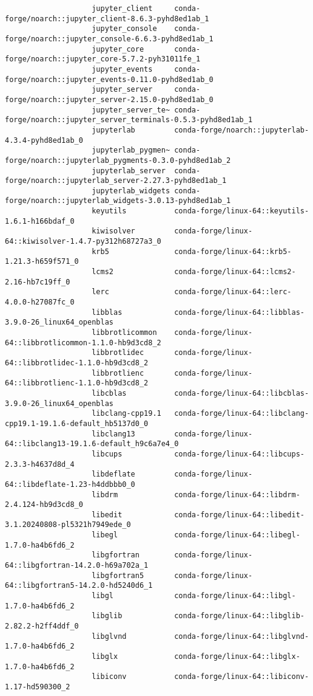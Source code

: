 \documentclass{article}
\begin{document}
\begin{enumerate}
\begin{itemize}
\begin{itemize}
\begin{itemize}
\begin{verbatim}
					jupyter_client     conda-forge/noarch::jupyter_client-8.6.3-pyhd8ed1ab_1 
					jupyter_console    conda-forge/noarch::jupyter_console-6.6.3-pyhd8ed1ab_1 
					jupyter_core       conda-forge/noarch::jupyter_core-5.7.2-pyh31011fe_1 
					jupyter_events     conda-forge/noarch::jupyter_events-0.11.0-pyhd8ed1ab_0 
					jupyter_server     conda-forge/noarch::jupyter_server-2.15.0-pyhd8ed1ab_0 
					jupyter_server_te~ conda-forge/noarch::jupyter_server_terminals-0.5.3-pyhd8ed1ab_1 
					jupyterlab         conda-forge/noarch::jupyterlab-4.3.4-pyhd8ed1ab_0 
					jupyterlab_pygmen~ conda-forge/noarch::jupyterlab_pygments-0.3.0-pyhd8ed1ab_2 
					jupyterlab_server  conda-forge/noarch::jupyterlab_server-2.27.3-pyhd8ed1ab_1 
					jupyterlab_widgets conda-forge/noarch::jupyterlab_widgets-3.0.13-pyhd8ed1ab_1 
					keyutils           conda-forge/linux-64::keyutils-1.6.1-h166bdaf_0 
					kiwisolver         conda-forge/linux-64::kiwisolver-1.4.7-py312h68727a3_0 
					krb5               conda-forge/linux-64::krb5-1.21.3-h659f571_0 
					lcms2              conda-forge/linux-64::lcms2-2.16-hb7c19ff_0 
					lerc               conda-forge/linux-64::lerc-4.0.0-h27087fc_0 
					libblas            conda-forge/linux-64::libblas-3.9.0-26_linux64_openblas 
					libbrotlicommon    conda-forge/linux-64::libbrotlicommon-1.1.0-hb9d3cd8_2 
					libbrotlidec       conda-forge/linux-64::libbrotlidec-1.1.0-hb9d3cd8_2 
					libbrotlienc       conda-forge/linux-64::libbrotlienc-1.1.0-hb9d3cd8_2 
					libcblas           conda-forge/linux-64::libcblas-3.9.0-26_linux64_openblas 
					libclang-cpp19.1   conda-forge/linux-64::libclang-cpp19.1-19.1.6-default_hb5137d0_0 
					libclang13         conda-forge/linux-64::libclang13-19.1.6-default_h9c6a7e4_0 
					libcups            conda-forge/linux-64::libcups-2.3.3-h4637d8d_4 
					libdeflate         conda-forge/linux-64::libdeflate-1.23-h4ddbbb0_0 
					libdrm             conda-forge/linux-64::libdrm-2.4.124-hb9d3cd8_0 
					libedit            conda-forge/linux-64::libedit-3.1.20240808-pl5321h7949ede_0 
					libegl             conda-forge/linux-64::libegl-1.7.0-ha4b6fd6_2 
					libgfortran        conda-forge/linux-64::libgfortran-14.2.0-h69a702a_1 
					libgfortran5       conda-forge/linux-64::libgfortran5-14.2.0-hd5240d6_1 
					libgl              conda-forge/linux-64::libgl-1.7.0-ha4b6fd6_2 
					libglib            conda-forge/linux-64::libglib-2.82.2-h2ff4ddf_0 
					libglvnd           conda-forge/linux-64::libglvnd-1.7.0-ha4b6fd6_2 
					libglx             conda-forge/linux-64::libglx-1.7.0-ha4b6fd6_2 
					libiconv           conda-forge/linux-64::libiconv-1.17-hd590300_2 

\end{verbatim}
\end{itemize}
\end{itemize}
\end{itemize}
\end{enumerate}
\end{document}
